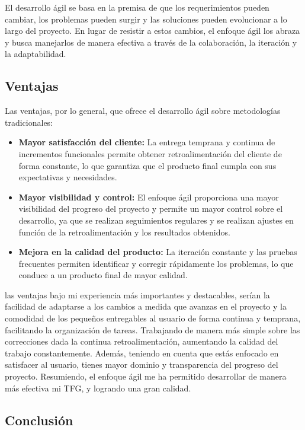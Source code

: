 El desarrollo ágil se basa en la premisa de que los requerimientos pueden cambiar, los problemas pueden surgir y las soluciones pueden evolucionar a lo largo del proyecto. En lugar de resistir a estos cambios, el enfoque ágil los abraza y busca manejarlos de manera efectiva a través de la colaboración, la iteración y la adaptabilidad.

\subsection{Ventajas}

Las ventajas, por lo general, que ofrece el desarrollo ágil sobre metodologías tradicionales:

\begin{itemize}
\item \textbf{Mayor satisfacción del cliente:} La entrega temprana y continua de incrementos funcionales permite obtener retroalimentación del cliente de forma constante, lo que garantiza que el producto final cumpla con sus expectativas y necesidades.
\item \textbf{Mayor visibilidad y control:} El enfoque ágil proporciona una mayor visibilidad del progreso del proyecto y permite un mayor control sobre el desarrollo, ya que se realizan seguimientos regulares y se realizan ajustes en función de la retroalimentación y los resultados obtenidos.
\item \textbf{Mejora en la calidad del producto:} La iteración constante y las pruebas frecuentes permiten identificar y corregir rápidamente los problemas, lo que conduce a un producto final de mayor calidad.
\end{itemize}

las ventajas bajo mi experiencia más importantes y destacables, serían la facilidad de adaptarse a los cambios a medida que avanzas en el proyecto y la comodidad de los pequeños entregables al usuario de forma continua y temprana, facilitando la organización de tareas. Trabajando de manera más simple sobre las correcciones dada la continua retroalimentación, aumentando la calidad del trabajo constantemente. Además, teniendo en cuenta que estás enfocado en satisfacer al usuario, tienes mayor dominio y transparencia del progreso del proyecto. Resumiendo, el enfoque ágil me ha permitido desarrollar de manera más efectiva mi TFG, y logrando una gran calidad.


\subsection{Conclusión}

